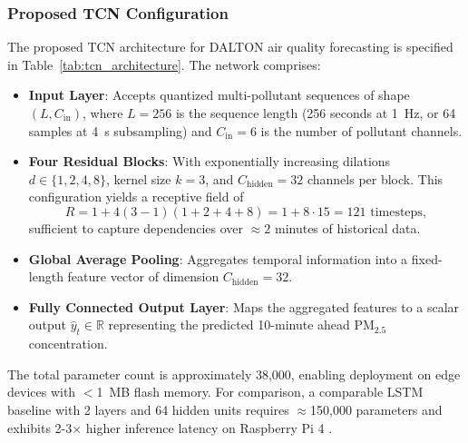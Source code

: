 \subsubsection{Proposed TCN Configuration}

The proposed TCN architecture for DALTON air quality forecasting is specified in Table~\ref{tab:tcn_architecture}. The network comprises:

\begin{itemize}
\item \textbf{Input Layer}: Accepts quantized multi-pollutant sequences of shape $(L, C_{\text{in}})$, where $L = 256$ is the sequence length (256 seconds at 1~Hz, or 64 samples at 4~s subsampling) and $C_{\text{in}} = 6$ is the number of pollutant channels.

\item \textbf{Four Residual Blocks}: With exponentially increasing dilations $d \in \{1, 2, 4, 8\}$, kernel size $k = 3$, and $C_{\text{hidden}} = 32$ channels per block. This configuration yields a receptive field of
\begin{equation}
R = 1 + 4(3-1)(1 + 2 + 4 + 8) = 1 + 8 \cdot 15 = 121 \text{ timesteps},
\end{equation}
sufficient to capture dependencies over $\approx 2$ minutes of historical data.

\item \textbf{Global Average Pooling}: Aggregates temporal information into a fixed-length feature vector of dimension $C_{\text{hidden}} = 32$.

\item \textbf{Fully Connected Output Layer}: Maps the aggregated features to a scalar output $\hat{y}_t \in \mathbb{R}$ representing the predicted 10-minute ahead PM$_{2.5}$ concentration.
\end{itemize}

The total parameter count is approximately 38,000, enabling deployment on edge devices with $<$1~MB flash memory. For comparison, a comparable LSTM baseline with 2 layers and 64 hidden units requires $\approx$150,000 parameters and exhibits 2-3$\times$ higher inference latency on Raspberry Pi 4 \cite{mazinani2025air}.

